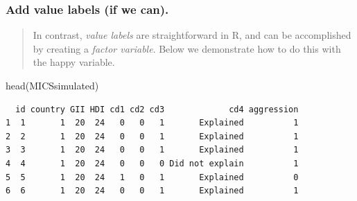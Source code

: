 \documentclass[
  letterpaper,
  DIV=11,
  numbers=noendperiod]{scrreprt}
\newenvironment{Shaded}{\begin{snugshade}}{\end{snugshade}}
\newcommand{\AttributeTok}[1]{\textcolor[rgb]{0.40,0.45,0.13}{#1}}
\newcommand{\DecValTok}[1]{\textcolor[rgb]{0.68,0.00,0.00}{#1}}
\newcommand{\FunctionTok}[1]{\textcolor[rgb]{0.28,0.35,0.67}{#1}}
\newcommand{\NormalTok}[1]{\textcolor[rgb]{0.00,0.23,0.31}{#1}}
\newcommand{\OtherTok}[1]{\textcolor[rgb]{0.00,0.23,0.31}{#1}}
\newcommand{\SpecialCharTok}[1]{\textcolor[rgb]{0.37,0.37,0.37}{#1}}
\newcommand{\StringTok}[1]{\textcolor[rgb]{0.13,0.47,0.30}{#1}}
\begin{document}
\begin{Shaded}
\end{Shaded}

\hypertarget{sec-addvaluelabels}{%
\subsubsection{Add value labels (if we can).}\label{sec-addvaluelabels}}

\begin{quote}
In contrast, \emph{value labels} are straightforward in R, and can be
accomplished by creating a \emph{factor variable}. Below we demonstrate
how to do this with the happy variable.
\end{quote}

\begin{Shaded}
\end{Shaded}

\begin{Shaded}
\begin{Highlighting}[]
\FunctionTok{head}\NormalTok{(MICSsimulated)}
\end{Highlighting}
\end{Shaded}

\begin{verbatim}
  id country GII HDI cd1 cd2 cd3             cd4 aggression
1  1       1  20  24   0   0   1       Explained          1
2  2       1  20  24   0   0   1       Explained          1
3  3       1  20  24   0   0   1       Explained          1
4  4       1  20  24   0   0   0 Did not explain          1
5  5       1  20  24   1   0   1       Explained          0
6  6       1  20  24   0   0   1       Explained          1
\end{verbatim}
\end{document}
